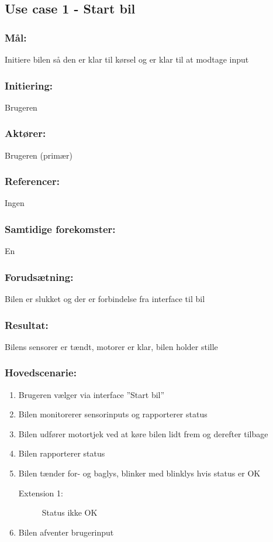\begin{framed}
	\subsection{Use case 1 - Start bil}
	\subsubsection*{Mål:}
		Initiere bilen så den er klar til kørsel og er klar til at modtage input
		
	\subsubsection*{Initiering:}
		Brugeren
	
	\subsubsection*{Aktører:}
		Brugeren (primær)
	
	\subsubsection*{Referencer:}
		Ingen
	
	\subsubsection*{Samtidige forekomster:}
		En
	
	\subsubsection*{Forudsætning:}
		Bilen er slukket og der er forbindelse fra interface til bil
	
	\subsubsection*{Resultat:}
		Bilens sensorer er tændt, motorer er klar, bilen holder stille
	
	\subsubsection*{Hovedscenarie:}
		\begin{enumerate}
			\item Brugeren vælger via interface ''Start bil''
			\item Bilen monitorerer sensorinputs og rapporterer status 
			\item Bilen udfører motortjek ved at køre bilen lidt frem og derefter tilbage
			\item Bilen rapporterer status
			\item Bilen tænder for- og baglys, blinker med blinklys hvis status er OK 
			\begin{description}
					\item[Extension 1:] Status ikke OK
			\end{description}
			\item Bilen afventer brugerinput
		\end{enumerate}
	

\end{framed}
